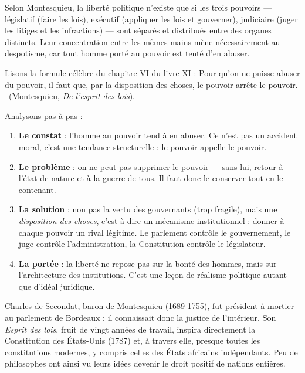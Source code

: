 \documentclass[11pt]{article}
\newcommand{\cle}[1]{{\popxbold\color{popdark}#1}}
\begin{document}
\begin{propriete}
Selon Montesquieu, la liberté politique n'existe que si les trois pouvoirs — \cle{législatif} (faire les lois), \cle{exécutif} (appliquer les lois et gouverner), \cle{judiciaire} (juger les litiges et les infractions) — sont séparés et distribués entre des organes distincts. Leur concentration entre les mêmes mains mène nécessairement au despotisme, car tout homme porté au pouvoir est tenté d'en abuser.
\end{propriete}

\begin{experience}
Lisons la formule célèbre du chapitre VI du livre XI : \guillemotleft Pour qu'on ne puisse abuser du pouvoir, il faut que, par la disposition des choses, le pouvoir arrête le pouvoir. \guillemotright\ (Montesquieu, \emph{De l'esprit des lois}).

Analysons pas à pas :
\begin{enumerate}
\item \textbf{Le constat} : l'homme au pouvoir tend à en abuser. Ce n'est pas un accident moral, c'est une tendance structurelle : le pouvoir appelle le pouvoir.
\item \textbf{Le problème} : on ne peut pas supprimer le pouvoir — sans lui, retour à l'état de nature et à la guerre de tous. Il faut donc le conserver tout en le contenant.
\item \textbf{La solution} : non pas la vertu des gouvernants (trop fragile), mais une \emph{disposition des choses}, c'est-à-dire un mécanisme institutionnel : donner à chaque pouvoir un rival légitime. Le parlement contrôle le gouvernement, le juge contrôle l'administration, la Constitution contrôle le législateur.
\item \textbf{La portée} : la liberté ne repose pas sur la bonté des hommes, mais sur l'architecture des institutions. C'est une leçon de réalisme politique autant que d'idéal juridique.
\end{enumerate}
\end{experience}

\begin{savaistu}
Charles de Secondat, baron de Montesquieu (1689-1755), fut président à mortier au parlement de Bordeaux : il connaissait donc la justice de l'intérieur. Son \emph{Esprit des lois}, fruit de vingt années de travail, inspira directement la Constitution des États-Unis (1787) et, à travers elle, presque toutes les constitutions modernes, y compris celles des États africains indépendants. Peu de philosophes ont ainsi vu leurs idées devenir le droit positif de nations entières.
\end{savaistu}
\end{document}
